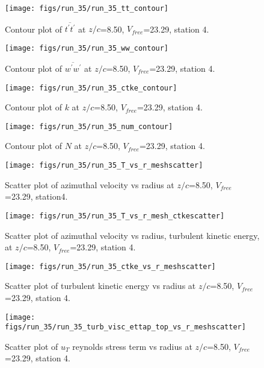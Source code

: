 \begin{figure}[H]
\centering
\texttt{[image: figs/run\_35/run\_35\_tt\_contour]}
\caption{Contour plot of $\overline{t^\prime t^\prime}$ at $z/c$=8.50, $V_{free}$=23.29, station 4.}
\end{figure}


\begin{figure}[H]
\centering
\texttt{[image: figs/run\_35/run\_35\_ww\_contour]}
\caption{Contour plot of $\overline{w^\prime w^\prime}$ at $z/c$=8.50, $V_{free}$=23.29, station 4.}
\end{figure}


\begin{figure}[H]
\centering
\texttt{[image: figs/run\_35/run\_35\_ctke\_contour]}
\caption{Contour plot of $k$ at $z/c$=8.50, $V_{free}$=23.29, station 4.}
\end{figure}


\begin{figure}[H]
\centering
\texttt{[image: figs/run\_35/run\_35\_num\_contour]}
\caption{Contour plot of $N$ at $z/c$=8.50, $V_{free}$=23.29, station 4.}
\end{figure}


\begin{figure}[H]
\centering
\texttt{[image: figs/run\_35/run\_35\_T\_vs\_r\_meshscatter]}
\caption{Scatter plot of azimuthal velocity vs radius at $z/c$=8.50, $V_{free}$=23.29, station4.}
\end{figure}


\begin{figure}[H]
\centering
\texttt{[image: figs/run\_35/run\_35\_T\_vs\_r\_mesh\_ctkescatter]}
\caption{Scatter plot of azimuthal velocity vs radius, turbulent kinetic energy, at $z/c$=8.50, $V_{free}$=23.29, station 4.}
\end{figure}


\begin{figure}[H]
\centering
\texttt{[image: figs/run\_35/run\_35\_ctke\_vs\_r\_meshscatter]}
\caption{Scatter plot of turbulent kinetic energy vs radius at $z/c$=8.50, $V_{free}$=23.29, station 4.}
\end{figure}


\begin{figure}[H]
\centering
\texttt{[image: figs/run\_35/run\_35\_turb\_visc\_ettap\_top\_vs\_r\_meshscatter]}
\caption{Scatter plot of $
u_T$ reynolds stress term vs radius at $z/c$=8.50, $V_{free}$=23.29, station 4.}
\end{figure}


